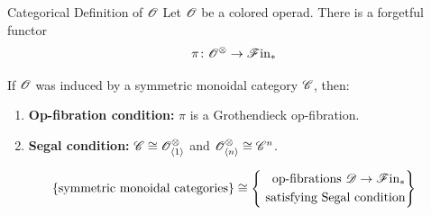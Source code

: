 \begin{frame}{Categorical Definition of $\mathscr{O}$}
  Let $\mathscr{O}$ be a colored operad. There is a forgetful functor 
\[
\pi \colon \mathscr{O}^{\otimes} \to \mathscr{F} \text{in}_{\ast}
\]
\pause
  \begin{prop}\label{m1m2} If $\mathscr{O}$ was induced by a symmetric monoidal category $\mathscr{C}$, then:
    \begin{enumerate}[(M1)]
        \item \textbf{Op-fibration condition:} $\pi$ is a Grothendieck
        op-fibration. 
        \item \textbf{Segal condition:} $\mathscr{C} \cong
        \mathscr{O}^{\otimes}_{\langle 1 \rangle}$ and
        $\mathscr{O}^{\otimes}_{\langle n \rangle} \cong \mathscr{C}^n$.
    \end{enumerate}
  \end{prop}
\pause
  \begin{prop}
    $$\{\text{symmetric monoidal categories}\} \cong \left\{\begin{aligned}\text{op-fibrations } \mathscr{D} \to \mathscr{F} \text{in}_{\ast} \\
      \text{ satisfying Segal condition}\end{aligned}\right\}$$
  \end{prop}
\end{frame}


